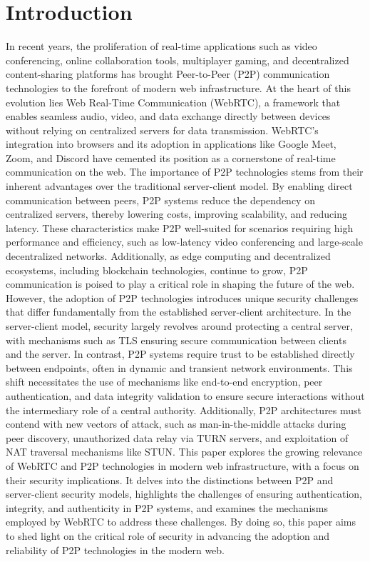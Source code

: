 \documentclass[conference]{IEEEtran}
\begin{document}
\section{Introduction}
In recent years, the proliferation of real-time applications such as video conferencing, online collaboration tools, multiplayer gaming, 
and decentralized content-sharing platforms has brought Peer-to-Peer (P2P) communication technologies to the forefront of modern web 
infrastructure. At the heart of this evolution lies Web Real-Time Communication (WebRTC), a framework that enables seamless audio, video,
and data exchange directly between devices without relying on centralized servers for data transmission. WebRTC's integration into browsers and 
its adoption in applications like Google Meet, Zoom, and Discord have cemented its position as a cornerstone of real-time communication on the web.
The importance of P2P technologies stems from their inherent advantages over the traditional server-client model. By enabling direct communication 
between peers, P2P systems reduce the dependency on centralized servers, thereby lowering costs, improving scalability, and reducing latency. %
These characteristics make P2P well-suited for scenarios requiring high performance and efficiency, such as low-latency video conferencing 
and large-scale decentralized networks. Additionally, as edge computing and decentralized ecosystems, including blockchain technologies, continue 
to grow, P2P communication is poised to play a critical role in shaping the future of the web.
However, the adoption of P2P technologies 
introduces unique security challenges that differ fundamentally from the established server-client architecture. In the server-client model,
security largely revolves around protecting a central server, with mechanisms such as TLS ensuring secure communication between clients and
the server. In contrast, P2P systems require trust to be established directly between endpoints, often in dynamic and transient network 
environments. This shift necessitates the use of mechanisms like end-to-end encryption, peer authentication, and data integrity validation to
ensure secure interactions without the intermediary role of a central authority. Additionally, P2P architectures must contend with new vectors
of attack, such as man-in-the-middle attacks during peer discovery, unauthorized data relay via TURN servers, and exploitation of NAT traversal
mechanisms like STUN. This paper explores the growing relevance of WebRTC and P2P technologies in modern web infrastructure, with a focus on 
their security implications. It delves into the distinctions between P2P and server-client security models, highlights the challenges of ensuring 
authentication, integrity, and authenticity in P2P systems, and examines the mechanisms employed by WebRTC to address these challenges. By doing so, 
this paper aims to shed light on the critical role of security in advancing the adoption and reliability of P2P technologies in the modern web.
\end{document}
